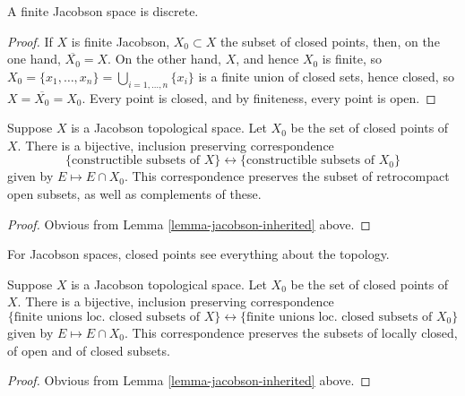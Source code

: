 \begin{lemma}
\label{lemma-finite-jacobson}
A finite Jacobson space is discrete.
\end{lemma}

\begin{proof}
If $X$ is finite Jacobson, $X_0 \subset X$ the subset of closed points,
then, on the one hand, $\overline{X_0} = X$. On the other hand, $X$,
and hence $X_0$ is finite, so
$X_0 =\{x_1, \ldots, x_n\} = \bigcup_{i = 1, \ldots, n} \{x_i\}$
is a finite union of closed sets, hence closed, so
$X = \overline{X_0} = X_0$. Every point is closed, and by
finiteness, every point is open.
\end{proof}

\begin{lemma}
\label{lemma-jacobson-equivalent-constructible}
Suppose $X$ is a Jacobson topological space.
Let $X_0$ be the set of closed points of $X$.
There is a bijective, inclusion preserving correspondence
$$
\{\text{constructible subsets of } X\}
\leftrightarrow
\{\text{constructible subsets of } X_0\}
$$
given by $E \mapsto E \cap X_0$. This correspondence preserves
the subset of retrocompact open subsets, as well as complements
of these.
\end{lemma}

\begin{proof}
Obvious from Lemma \ref{lemma-jacobson-inherited} above.
\end{proof}

\begin{lemma}
\label{lemma-jacobson-equivalent-locally-closed}
\begin{slogan}
For Jacobson spaces, closed points see everything about the topology.
\end{slogan}
Suppose $X$ is a Jacobson topological space.
Let $X_0$ be the set of closed points of $X$.
There is a bijective, inclusion preserving correspondence
$$
\{\text{finite unions loc.\ closed subsets of } X\}
\leftrightarrow
\{\text{finite unions loc.\ closed subsets of } X_0\}
$$
given by $E \mapsto E \cap X_0$. This correspondence preserves
the subsets of locally closed, of open and of closed subsets.
\end{lemma}

\begin{proof}
Obvious from Lemma \ref{lemma-jacobson-inherited} above.
\end{proof}


















